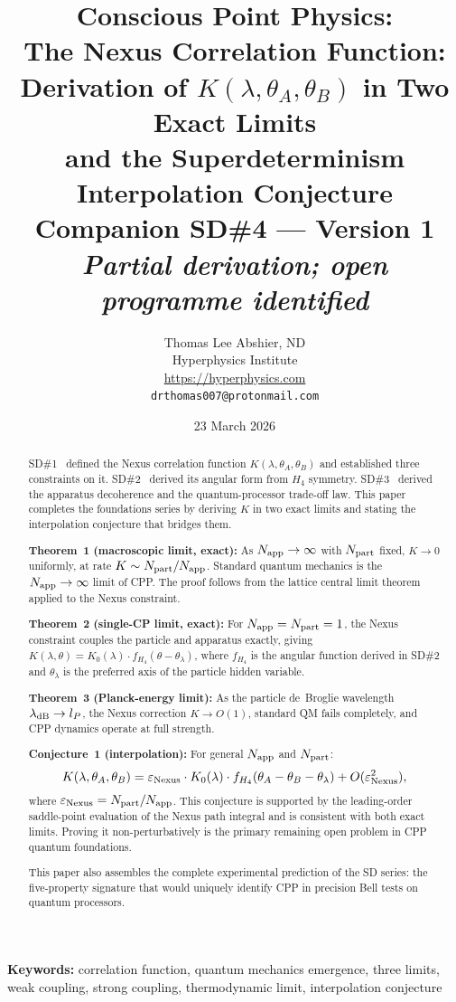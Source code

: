 \documentclass[11pt,letterpaper]{article}
\title{\textbf{Conscious Point Physics:\\
The Nexus Correlation Function:\\
Derivation of $K(\lambda,\theta_A,\theta_B)$ in Two Exact Limits\\
and the Superdeterminism Interpolation Conjecture}\\[6pt]
{\large Companion SD\#4 --- Version 1}\\[4pt]
{\normalsize \textit{Partial derivation; open programme identified}}}
\author{Thomas Lee Abshier, ND\\
Hyperphysics Institute\\
\url{https://hyperphysics.com}\\
\texttt{drthomas007@protonmail.com}}
\date{23 March 2026}
\newcommand{\lP}{l_P}
\newcommand{\eps}{\varepsilon}
\newcommand{\Napp}{N_{\rm app}}
\newcommand{\Npart}{N_{\rm part}}
\begin{document}
\maketitle

\begin{abstract}
SD\#1~\citep{cpp_sd1} defined the Nexus correlation function
$K(\lambda,\theta_A,\theta_B)$ and established three constraints on
it.  SD\#2~\citep{cpp_sd2} derived its angular form from $H_4$
symmetry.  SD\#3~\citep{cpp_sd3} derived the apparatus decoherence
and the quantum-processor trade-off law.  This paper completes the
foundations series by deriving $K$ in two exact limits and stating
the interpolation conjecture that bridges them.

\textbf{Theorem~1 (macroscopic limit, exact):}
As $\Napp \to \infty$ with $\Npart$ fixed, $K \to 0$ uniformly,
at rate $K \sim \Npart/\Napp$.  Standard quantum mechanics is the
$\Napp\to\infty$ limit of CPP.  The proof follows from the
lattice central limit theorem applied to the Nexus constraint.

\textbf{Theorem~2 (single-CP limit, exact):}
For $\Napp = \Npart = 1$, the Nexus constraint couples the particle
and apparatus exactly, giving $K(\lambda,\theta) = K_0(\lambda)
\cdot f_{H_4}(\theta - \theta_\lambda)$, where $f_{H_4}$ is the
angular function derived in SD\#2 and $\theta_\lambda$ is the
preferred axis of the particle hidden variable.

\textbf{Theorem~3 (Planck-energy limit):}
As the particle de~Broglie wavelength $\lambda_{\rm dB} \to \lP$,
the Nexus correction $K \to O(1)$, standard QM fails completely,
and CPP dynamics operate at full strength.

\textbf{Conjecture~1 (interpolation):}
For general $\Napp$ and $\Npart$:
\[
K(\lambda,\theta_A,\theta_B)
= \eps_{\rm Nexus}\cdot K_0(\lambda)
  \cdot f_{H_4}(\theta_A-\theta_B-\theta_\lambda)
  + O(\eps_{\rm Nexus}^2),
\]
where $\eps_{\rm Nexus} = \Npart/\Napp$.  This conjecture is
supported by the leading-order saddle-point evaluation of the
Nexus path integral and is consistent with both exact limits.
Proving it non-perturbatively is the primary remaining open problem
in CPP quantum foundations.

This paper also assembles the complete experimental prediction of
the SD series: the five-property signature that would uniquely
identify CPP in precision Bell tests on quantum processors.
\end{abstract}

\medskip\noindent
\textbf{Keywords:} correlation function, quantum mechanics emergence, three limits, weak coupling, strong coupling, thermodynamic limit, interpolation conjecture
\end{document}
